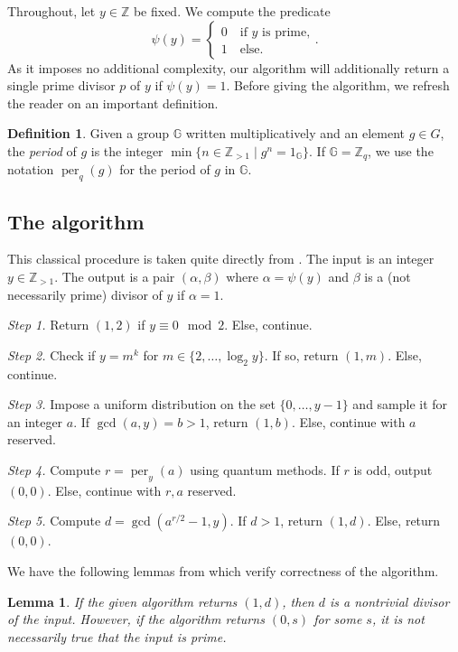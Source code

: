 \documentclass{amsart}
\newcommand{\Zz}{\mathbb{Z}}
\DeclareMathOperator{\per}{per}
\newtheorem{lemma}[theorem]{Lemma}
\theoremstyle{definition}
\newtheorem{definition}[theorem]{Definition}
\theoremstyle{remark}
\begin{document}
Throughout, let $y \in \Zz$ be fixed. We compute the predicate
\[
    \psi(y) = \begin{cases}
        0 \quad \text{if $y$ is prime,} \\
        1 \quad \text{else.}
    \end{cases}.
\]
As it imposes no additional complexity, our algorithm will additionally return a
single prime divisor $p$ of $y$ if $\psi(y) = 1$. Before giving the algorithm,
we refresh the reader on an important definition.

\begin{definition}
    Given a group $\mathbb{G}$ written multiplicatively and an element $g \in
    G$, the \textit{period} of $g$ is the integer $\min \{ n \in \Zz_{> 1} \mid
    g^n = 1_\mathbb{G} \}$. If $\mathbb{G} = \Zz_q$, we use the notation
    $\per_q(g)$ for the period of $g$ in $\mathbb{G}$.
\end{definition}

\subsection{The algorithm}

This classical procedure is taken quite directly from \cite{textbook}. The input
is an integer $y \in \Zz_{> 1}$. The output is a pair $(\alpha, \beta)$ where
$\alpha = \psi(y)$ and $\beta$ is a (not necessarily prime) divisor of $y$ if
$\alpha = 1$.

\textit{Step 1.} Return $(1, 2)$ if $y \equiv 0 \mod 2$. Else, continue.

\textit{Step 2.} Check if $y = m^k$ for $m \in \{2, \dots, \log_2{y}\}$. If so,
return $(1, m)$. Else, continue.

\textit{Step 3.} Impose a uniform distribution on the set $\{0, \dots, y - 1\}$
and sample it for an integer $a$. If $\gcd(a, y) = b > 1$, return $(1, b)$.
Else, continue with $a$ reserved.

\textit{Step 4.} Compute $r = \per_y(a)$ using quantum methods. If $r$ is odd,
output $(0, 0)$. Else, continue with $r, a$ reserved.

\textit{Step 5.} Compute $d = \gcd(a^{r/2} - 1, y)$. If $d > 1$, return $(1,
d)$. Else, return $(0, 0)$.

We have the following lemmas from \cite{textbook} which verify correctness of
the algorithm.

\begin{lemma}
    If the given algorithm returns $(1, d)$, then $d$ is a nontrivial divisor of
    the input. However, if the algorithm returns $(0, s)$ for some $s$, it is
    not necessarily true that the input is prime.
\end{lemma}
\end{document}
